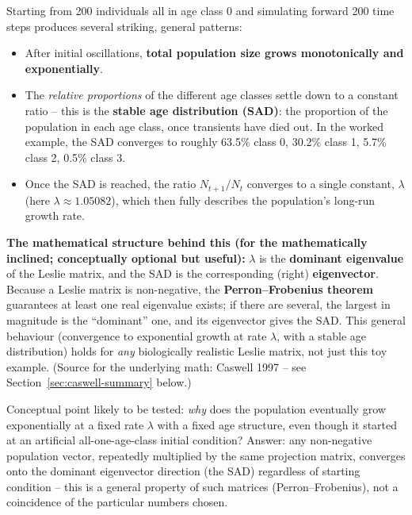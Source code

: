 \documentclass[11pt,a4paper]{article}
\begin{document}
Starting from 200 individuals all in age class 0 and simulating forward 200 time steps produces several striking, general patterns:
\begin{itemize}[leftmargin=1.5em]
\item After initial oscillations, \textbf{total population size grows monotonically and exponentially}.
\item The \emph{relative proportions} of the different age classes settle down to a constant ratio -- this is the \textbf{stable age distribution (SAD)}: the proportion of the population in each age class, once transients have died out. In the worked example, the SAD converges to roughly 63.5\% class 0, 30.2\% class 1, 5.7\% class 2, 0.5\% class 3.
\item Once the SAD is reached, the ratio $N_{t+1}/N_t$ converges to a single constant, $\lambda$ (here $\lambda \approx 1.05082$), which then fully describes the population's long-run growth rate.
\end{itemize}

\begin{keybox}
\textbf{The mathematical structure behind this (for the mathematically inclined; conceptually optional but useful):} $\lambda$ is the \textbf{dominant eigenvalue} of the Leslie matrix, and the SAD is the corresponding (right) \textbf{eigenvector}. Because a Leslie matrix is non-negative, the \textbf{Perron--Frobenius theorem} guarantees at least one real eigenvalue exists; if there are several, the largest in magnitude is the ``dominant'' one, and its eigenvector gives the SAD. This general behaviour (convergence to exponential growth at rate $\lambda$, with a stable age distribution) holds for \emph{any} biologically realistic Leslie matrix, not just this toy example. (Source for the underlying math: Caswell 1997 -- see Section~\ref{sec:caswell-summary} below.)
\end{keybox}

\begin{exambox}
Conceptual point likely to be tested: \emph{why} does the population eventually grow exponentially at a fixed rate $\lambda$ with a fixed age structure, even though it started at an artificial all-one-age-class initial condition? Answer: any non-negative population vector, repeatedly multiplied by the same projection matrix, converges onto the dominant eigenvector direction (the SAD) regardless of starting condition -- this is a general property of such matrices (Perron--Frobenius), not a coincidence of the particular numbers chosen.
\end{exambox}
\end{document}
